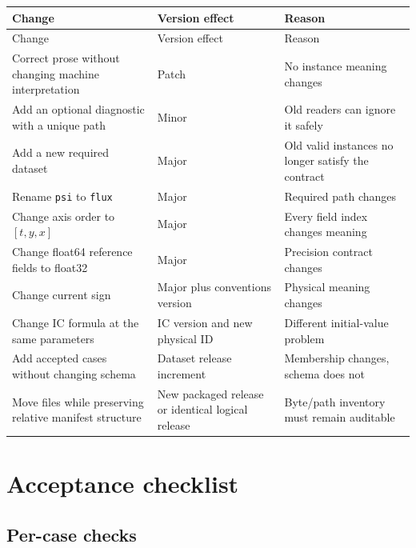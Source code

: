 \documentclass[11pt]{article}
\newcommand{\code}[1]{\texttt{#1}}
\begin{document}
\begin{longtable}{p{}p{}p{}}
\toprule
Change & Version effect & Reason \\
\midrule
\endfirsthead
\toprule
Change & Version effect & Reason \\
\midrule
\endhead
Correct prose without changing machine interpretation & Patch & No instance meaning changes \\
Add an optional diagnostic with a unique path & Minor & Old readers can ignore it safely \\
Add a new required dataset & Major & Old valid instances no longer satisfy the contract \\
Rename \code{psi} to \code{flux} & Major & Required path changes \\
Change axis order to $[t,y,x]$ & Major & Every field index changes meaning \\
Change float64 reference fields to float32 & Major & Precision contract changes \\
Change current sign & Major plus conventions version & Physical meaning changes \\
Change IC formula at the same parameters & IC version and new physical ID & Different initial-value problem \\
Add accepted cases without changing schema & Dataset release increment & Membership changes, schema does not \\
Move files while preserving relative manifest structure & New packaged release or identical logical release & Byte/path inventory must remain auditable \\
\bottomrule
\end{longtable}

\section{Acceptance checklist}
\label{app:checklist}

\subsection*{Per-case checks}
\end{document}

